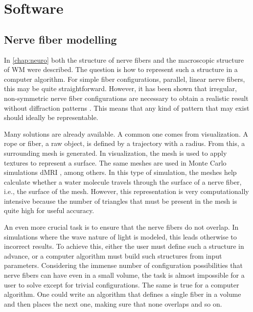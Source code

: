 \newpage\null\thispagestyle{empty}\newpage
\clearpage{\thispagestyle{empty}\cleardoublepage}
\part{Software}
\parttoc
% 
% 
% 
\setcounter{chapter}{3}
\chapter{Nerve fiber modelling}
\label{chap:sof:modelling}
% 
In \cref{chap:neuro} both the structure of nerve fibers and the macroscopic structure of \ac{WM} were described.
The question is how to represent such a structure in a computer algorithm.
For simple fiber configurations, \eg{} parallel, linear nerve fibers, this may be quite straightforward.
However, it has been shown that irregular, non-symmetric nerve fiber configurations are necessary to obtain a realistic result without diffraction patterns \cite{MenzelDissertation}.
This means that any kind of pattern that may exist should ideally be representable.
\par
%
Many solutions are already available.
A common one comes from visualization.
A rope or fiber, \ie{} a raw object, is defined by a trajectory with a radius.
From this, a surrounding mesh is generated.
In visualization, the mesh is used to apply textures to represent a surface.
The same meshes are used in Monte Carlo simulations \ac{dMRI} \cite{Ginsburger2019,ginsburgerDis2019}, among others.
In this type of simulation, the meshes help calculate whether a water molecule travels through the surface of a nerve fiber, i.e., the surface of the mesh.
However, this representation is very computationally intensive because the number of triangles that must be present in the mesh is quite high for useful accuracy.
\par
%
An even more crucial task is to ensure that the nerve fibers do not overlap.
In simulations where the wave nature of light is modeled, this leads otherwise to incorrect results.
To achieve this, either the user must define such a structure in advance, or a computer algorithm must build such structures from input parameters.
Considering the immense number of configuration possibilities that nerve fibers can have even in a small volume, the task is almost impossible for a user to solve except for trivial configurations.
The same is true for a computer algorithm.
One could write an algorithm that defines a single fiber in a volume and then places the next one, making sure that none overlaps and so on.
